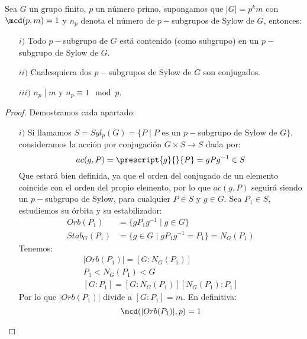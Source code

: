 \begin{teo}
    Sea $G$ un grupo finito, $p$ un número primo, supongamos que $|G| = p^k m$ con $\mcd(p,m) = 1$ y $n_p$ denota el número de $p-$subgrupos de Sylow de $G$, entonces:
    \begin{enumerate}
        \item[$i)$] Todo $p-$subgrupo de $G$ está contenido (como subgrupo) en un $p-$subgrupo de Sylow de $G$.
        \item[$ii)$] Cualesquiera dos $p-$subgrupos de Sylow de $G$ son conjugados.
        \item[$iii)$] $n_p \mid m$ y $n_p \equiv 1 \mod p$. 
    \end{enumerate}
    \begin{proof} %
        Demostramos cada apartado:
        \begin{enumerate}
            \item[$i)$] Si llamamos $S = Syl_p(G) = \{P \mid P \text{\ es un\ } p-\text{subgrupo\ de Sylow de\ } G\}$, consideramos la acción por conjugación $G\times S\to S$ dada por:
                \begin{equation*}
                    ac(g, P) = \prescript{g}{}{P} = gPg^{-1} \in S
                \end{equation*}
                Que estará bien definida, ya que el orden del conjugado de un elemento coincide con el orden del propio elemento, por lo que $ac(g,P)$ seguirá siendo un $p-$subgrupo de Sylow, para cualquier $P\in S$ y $g\in G$. Sea $P_1\in S$, estudiemos su órbita y su estabilizador:
                \begin{align*}
                    Orb(P_1) &= \{gP_1g^{-1}\mid g\in G\} \\
                    Stab_G(P_1) &= \{g\in G \mid gP_1g^{-1} = P_1\} = N_G(P_1)
                \end{align*}
                Tenemos:
                \begin{gather*}
                    |Orb(P_1)| = [G:N_G(P_1)] \\
                    P_1 < N_G(P_1) < G \\
                    [G:P_1] = [G:N_G(P_1)] [N_G(P_1):P_1]
                \end{gather*}
                Por lo que $|Orb(P_1)|$ divide a $[G:P_1] = m$. En definitiva:
                \begin{equation*}
                    \mcd(|Orb(P_1)|, p) = 1
                \end{equation*}


\end{enumerate}
\end{proof}
\end{teo}
